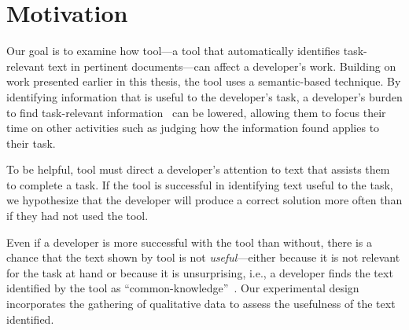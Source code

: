 


\section{Motivation}
\label{cp6:method}



Our goal is to examine how \acs{tool}---a tool that 
automatically identifies
task-relevant text in pertinent
documents---can affect a developer's work.
Building on work presented earlier in this
thesis, the tool  uses a semantic-based technique.
By identifying information that is useful to the developer's task,
a developer's burden to find task-relevant information~\cite{Robillard2015}
can be lowered,
allowing them to focus their time on other activities such as judging how the information found applies to their task.


To be helpful, \acs{tool} must direct a developer's attention to text that assists them to complete a task.
If the tool is successful in identifying text useful to the task, we hypothesize that
the developer will produce a correct solution more often than if they had not used the tool.





Even if a developer is more successful
with the tool than without, there is a chance that the text shown by \acs{tool} is not \textit{useful}---either because it is not relevant for the task at hand or because it is unsurprising, i.e.,
a developer finds the text identified by the tool as ``common-knowledge''~\cite{cwalina2008, Robillard2015}. Our experimental design incorporates the gathering of qualitative data to assess the usefulness of the text identified.

 




